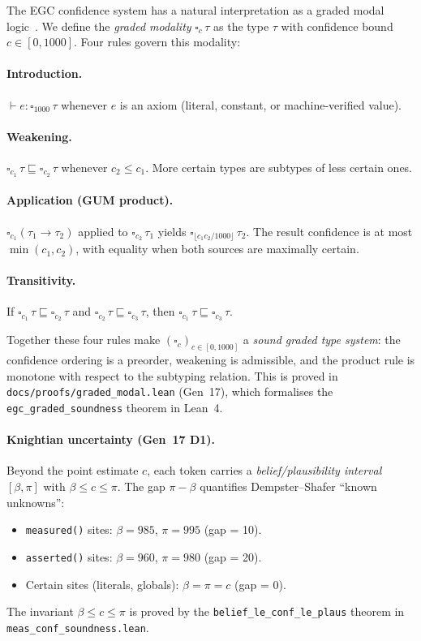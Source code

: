 \documentclass[acmsmall,screen,review,anonymous]{acmart}
\begin{document}
The EGC confidence system has a natural interpretation as a graded modal
logic~\cite{Fairtlough1997}.
We define the \emph{graded modality} $\square_c\,\tau$ as the type $\tau$ with
confidence bound $c \in [0, 1000]$.
Four rules govern this modality:

\paragraph{Introduction.}
$\vdash e : \square_{1000}\,\tau$ whenever $e$ is an axiom (literal,
constant, or machine-verified value).

\paragraph{Weakening.}
$\square_{c_1}\,\tau \sqsubseteq \square_{c_2}\,\tau$ whenever $c_2 \leq c_1$.
More certain types are subtypes of less certain ones.

\paragraph{Application (GUM product).}
$\square_{c_1}(\tau_1 \to \tau_2)$ applied to $\square_{c_2}\,\tau_1$ yields
$\square_{\lfloor c_1 c_2 / 1000 \rfloor}\,\tau_2$.
The result confidence is at most $\min(c_1, c_2)$, with equality when both
sources are maximally certain.

\paragraph{Transitivity.}
If $\square_{c_1}\,\tau \sqsubseteq \square_{c_2}\,\tau$ and
$\square_{c_2}\,\tau \sqsubseteq \square_{c_3}\,\tau$, then
$\square_{c_1}\,\tau \sqsubseteq \square_{c_3}\,\tau$.

\noindent
Together these four rules make $(\square_c)_{c \in [0,1000]}$ a
\emph{sound graded type system}: the confidence ordering is a preorder,
weakening is admissible, and the product rule is monotone with respect to
the subtyping relation.
This is proved in \texttt{docs/proofs/graded\_modal.lean} (Gen~17), which
formalises the \texttt{egc\_graded\_soundness} theorem in Lean~4.

\paragraph{Knightian uncertainty (Gen~17 D1).}
Beyond the point estimate $c$, each token carries a
\emph{belief/plausibility interval} $[\beta, \pi]$ with $\beta \leq c \leq \pi$.
The gap $\pi - \beta$ quantifies Dempster--Shafer ``known unknowns'':
\begin{itemize}
  \item \texttt{measured()} sites: $\beta = 985$, $\pi = 995$ (gap = 10).
  \item \texttt{asserted()} sites: $\beta = 960$, $\pi = 980$ (gap = 20).
  \item Certain sites (literals, globals): $\beta = \pi = c$ (gap = 0).
\end{itemize}
The invariant $\beta \leq c \leq \pi$ is proved by the
\texttt{belief\_le\_conf\_le\_plaus} theorem in
\texttt{meas\_conf\_soundness.lean}.
\end{document}

